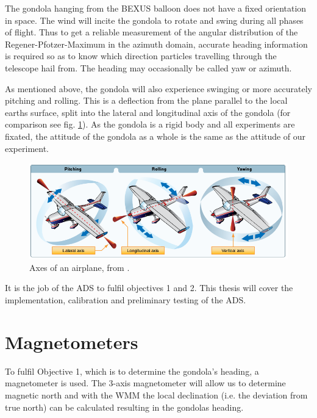 The gondola hanging from the \ac{BEXUS} balloon does not have a fixed orientation in space. The wind will incite the gondola to rotate and swing during all phases of flight. Thus to get a reliable measurement of the angular distribution of the Regener-Pfotzer-Maximum in the azimuth domain, accurate heading information is required so as to know which direction particles travelling through the telescope hail from. The heading may occasionally be called yaw or azimuth.


As mentioned above, the gondola will also experience swinging or more accurately pitching and rolling. This is a deflection from the plane parallel to the local earths surface, split into the lateral and longitudinal axis of the gondola (for comparison see fig. \ref{fig:attitude}). As the gondola is a rigid body and all experiments are fixated, the attitude of the gondola as a whole is the same as the attitude of our experiment.


\begin{figure}[H]
    \centering
    \includegraphics[width=0.5\linewidth]{images/01_background/axes_of_an_airplane.png}
    \caption[Axes of an airplane]{Axes of an airplane, from \cite{pilot-handbook}.}
    \label{fig:attitude}
\end{figure}

It is the job of the \ac{ADS} to fulfil objectives 1 and 2. This thesis will cover the implementation, calibration and preliminary testing of the \ac{ADS}.

\section{Magnetometers \label{sec:bg:magnetometers}}
To fulfil Objective 1, which is to determine the gondola's heading, a magnetometer is used. The 3-axis magnetometer will allow us to determine magnetic north and with the \ac{WMM} the local declination (i.e. the deviation from true north) can be calculated resulting in the gondolas heading. 

